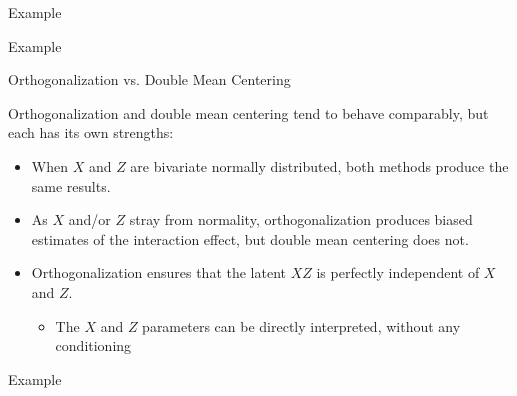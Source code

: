 \documentclass{beamer}
\newcommand{\vb}[0]{\vspace{6pt}}
\newcommand{\vc}[0]{\vspace{3pt}}
\begin{document}
\begin{frame}[allowframebreaks]{Example}
  


\pagebreak



\pagebreak



\end{frame}


\begin{frame}[allowframebreaks]{Example}
  


\pagebreak



\end{frame}


\begin{frame}{Orthogonalization vs. Double Mean Centering}
  
  Orthogonalization and double mean centering tend to behave
  comparably, but each has its own strengths: 
  \vb
  \begin{itemize}
    \item When $X$ and $Z$ are bivariate normally distributed, both
      methods produce the same results.
      \vb
    \item As $X$ and/or $Z$ stray from normality, orthogonalization
      produces biased estimates of the interaction effect, but double
      mean centering does not.
      \vb
    \item Orthogonalization ensures that the latent $XZ$ is perfectly
      independent of $X$ and $Z$.
      \vc
      \begin{itemize}
        \item The $X$ and $Z$ parameters can be directly interpreted,
          without any conditioning
      \end{itemize}
  \end{itemize}
  
\end{frame}



\begin{frame}[allowframebreaks]{Example}
  


\end{frame}
\end{document}
